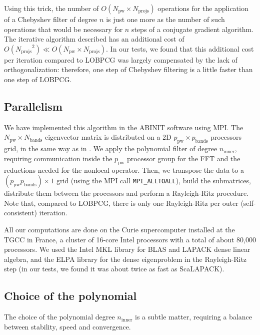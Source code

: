 \documentclass[11pt]{elsarticle}
\newcommand{\npw}{\ensuremath{N_{\text{pw}}}\xspace}
\newcommand{\nline}{\ensuremath{n_{\text{inner}}}\xspace}
\newcommand{\nprojs}{\ensuremath{N_{\text{projs}}}\xspace}
\newcommand{\nband}{\ensuremath{N_{\text{bands}}}\xspace}
\newcommand{\nppw}{\ensuremath{p_{\text{pw}}}\xspace}
\newcommand{\npband}{\ensuremath{p_{\text{bands}}}\xspace}
\begin{document}
Using this trick, the number of $O(\npw \times \nprojs)$ operations
for the application of a Chebyshev filter of degree $n$ is just one
more as the number of such operations that would be necessary for $n$
steps of a conjugate gradient algorithm. The iterative algorithm
described has an additional cost of $O(\nprojs^{2}) \ll O(\npw \times
\nprojs)$. In our tests, we found that this additional cost per
iteration compared to LOBPCG was largely compensated by the lack of
orthogonalization: therefore, one step of Chebyshev filtering is a
little faster than one step of LOBPCG.

\subsection{Parallelism}
We have implemented this algorithm in the ABINIT software using
MPI. The $\npw \times \nband$ eigenvector matrix is distributed on a
2D $\nppw \times \npband $ processors grid, in the same way as in
\cite{bottin2008large}. We apply the polynomial filter of degree
\nline, requiring communication inside the $\nppw$ processor group for
the FFT and the reductions needed for the nonlocal operator. Then, we
transpose the data to a $(\nppw \npband) \times 1$ grid (using the MPI
call \texttt{MPI\_ALLTOALL}), build the submatrices, distribute them
between the processors and perform a Rayleigh-Ritz procedure. Note
that, compared to LOBPCG, there is only one Rayleigh-Ritz per outer
(self-consistent) iteration.

All our computations are done on the Curie supercomputer installed at
the TGCC in France, a cluster of 16-core Intel processors with a total
of about 80,000 processors. We used the Intel MKL library for BLAS and
LAPACK dense linear algebra, and the ELPA library
\cite{auckenthaler2011parallel} for the dense eigenproblem in the
Rayleigh-Ritz step (in our tests, we found it was about twice as fast
as ScaLAPACK).

\subsection{Choice of the polynomial}
The choice of the polynomial degree \nline is a subtle matter,
requiring a balance between stability, speed and convergence.
\end{document}
